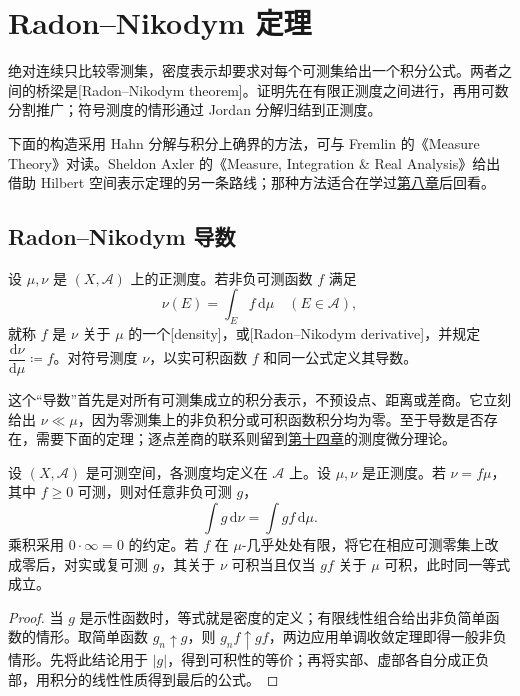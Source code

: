 \section{Radon–Nikodym 定理}
\label{b1:sec:0604}

绝对连续只比较零测集，密度表示却要求对每个可测集给出一个积分公式。两者之间的桥梁是[Radon--Nikodym theorem]。证明先在有限正测度之间进行，再用可数分割推广；符号测度的情形通过 Jordan 分解归结到正测度。

\ProseParagraphBreak

下面的构造采用 Hahn 分解与积分上确界的方法，可与 Fremlin 的《Measure Theory》\cite[Volume 2, \S232]{Fremlin2016Measure}对读。Sheldon Axler 的《Measure, Integration \& Real Analysis》\cite[Chapter 9]{Axler2020Measure}给出借助 Hilbert 空间表示定理的另一条路线；那种方法适合在学过\hyperref[b1:ch:08]{第八章}后回看。

\subsection{Radon–Nikodym 导数}
\label{b1:subsec:060401}

\begin{definition}\label{b1:def:radon-nikodym-derivative}
设 \(\mu,\nu\) 是 \((X,\mathcal A)\) 上的正测度。若非负可测函数 \(f\) 满足
\[
\nu(E)=\int_E f\,\mathrm d\mu\quad(E\in\mathcal A),
\]
就称 \(f\) 是 \(\nu\) 关于 \(\mu\) 的一个[density]，或[Radon--Nikodym derivative]，并规定 \(\dfrac{\mathrm d\nu}{\mathrm d\mu}\coloneqq f\)。对符号测度 \(\nu\)，以实可积函数 \(f\) 和同一公式定义其导数。
\end{definition}

这个“导数”首先是对所有可测集成立的积分表示，不预设点、距离或差商。它立刻给出 \(\nu\ll\mu\)，因为零测集上的非负积分或可积函数积分均为零。至于导数是否存在，需要下面的定理；逐点差商的联系则留到\hyperref[b1:ch:14]{第十四章}的测度微分理论。

\begin{proposition}\label{b1:prop:density-change-integral}
设 \((X,\mathcal A)\) 是可测空间，各测度均定义在 \(\mathcal A\) 上。设 \(\mu,\nu\) 是正测度。若 \(\nu=f\mu\)，其中 \(f\geq0\) 可测，则对任意非负可测 \(g\)，
\[
\int g\,\mathrm d\nu=\int gf\,\mathrm d\mu.
\]
乘积采用 \(0\cdot\infty=0\) 的约定。若 \(f\) 在 \(\mu\)-几乎处处有限，将它在相应可测零集上改成零后，对实或复可测 \(g\)，其关于 \(\nu\) 可积当且仅当 \(gf\) 关于 \(\mu\) 可积，此时同一等式成立。
\end{proposition}
\begin{proof}
当 \(g\) 是示性函数时，等式就是密度的定义；有限线性组合给出非负简单函数的情形。取简单函数 \(g_n\uparrow g\)，则 \(g_nf\uparrow gf\)，两边应用单调收敛定理即得一般非负情形。先将此结论用于 \(|g|\)，得到可积性的等价；再将实部、虚部各自分成正负部，用积分的线性性质得到最后的公式。
\end{proof}

